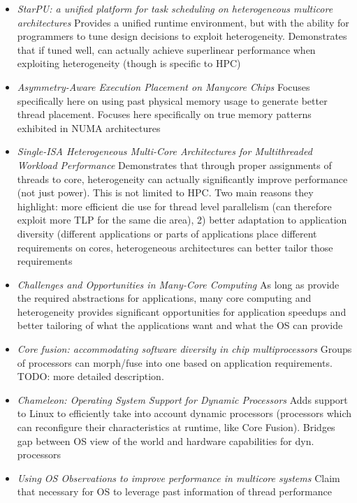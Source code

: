 \begin{itemize}
\item \emph{StarPU: a unified platform for task scheduling on heterogeneous
multicore architectures} Provides a unified runtime environment, but with the
ability for programmers to tune design decisions to exploit heterogeneity. Demonstrates
that if tuned well, can actually achieve superlinear performance when exploiting heterogeneity
(though is specific to HPC) \cite{CPE:CPE1631}
\item \emph{Asymmetry-Aware Execution Placement on Manycore Chips} Focuses
specifically here on using past physical memory usage to generate better thread
placement. Focuses here specifically on true memory patterns exhibited in 
NUMA architectures \cite{tumanovasymmetry}
\item \emph{Single-ISA Heterogeneous Multi-Core Architectures for Multithreaded Workload Performance}
Demonstrates that through proper assignments of threads to core, heterogeneity
can actually significantly improve performance (not just power). This is not
limited to HPC. Two main reasons they highlight: more efficient die use for thread
level parallelism (can therefore exploit more TLP for the same die area), 2)
better adaptation to application diversity (different applications or parts
of applications place
different requirements on cores, heterogeneous architectures can better
tailor those requirements \cite{Kumar:2004:SHM:998680.1006707}
\item \emph{Challenges and Opportunities
in Many-Core Computing} As long as provide the required abstractions for applications, 
many core computing and heterogeneity provides significant opportunities for application
speedups and better tailoring of what the applications want and what the OS can provide \cite{manferdelli2008challenges}
\item \emph{Core fusion: accommodating software diversity in chip multiprocessors}
Groups of processors can morph/fuse into one based on application requirements. 
TODO: more detailed description. \cite{Ipek:2007:CFA:1250662.1250686}
\item \emph{Chameleon: Operating System Support for Dynamic Processors}
Adds support to Linux to efficiently take into account dynamic processors (processors
which can reconfigure their characteristics at runtime, like Core Fusion).
Bridges gap between OS view of the world and hardware capabilities for dyn.
processors 
\item \emph{Using OS Observations to improve performance in multicore systems}
Claim that necessary for OS to leverage past information of thread performance

\end{itemize}
